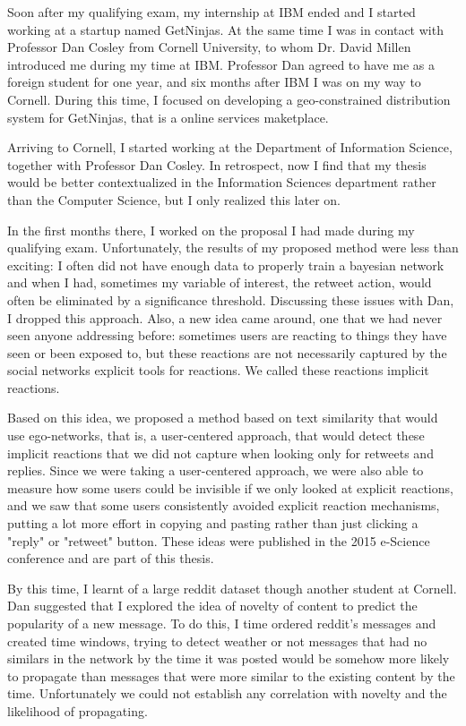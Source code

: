 Soon after my qualifying exam, my internship at IBM ended and I started working at a startup named GetNinjas. At the same time I was in contact with Professor Dan Cosley from Cornell University, to whom Dr. David Millen introduced me during my time at IBM. Professor Dan agreed to have me as a foreign student for one year, and six months after IBM I was on my way to Cornell. During this time, I focused on developing a geo-constrained distribution system for GetNinjas, that is a online services maketplace.

Arriving to Cornell, I started working at the Department of Information Science, together with Professor Dan Cosley. In retrospect, now I find that my thesis would be better contextualized in the Information Sciences department rather than the Computer Science, but I only realized this later on. 

In the first months there, I worked on the proposal I had made during my qualifying exam. Unfortunately, the results of my proposed method were less than exciting: I often did not have enough data to properly train a bayesian network and when I had, sometimes my variable of interest, the retweet action, would often be eliminated by a significance threshold. Discussing these issues with Dan, I dropped this approach. Also, a new idea came around, one that we had never seen anyone addressing before: sometimes users are reacting to things they have seen or been exposed to, but these reactions are not necessarily captured by the social networks explicit tools for reactions. We called these reactions implicit reactions.

Based on this idea, we proposed a method based on text similarity that would use ego-networks, that is, a user-centered approach, that would detect these implicit reactions that we did not capture when looking only for retweets and replies. Since we were taking a user-centered approach, we were also able to measure how some users could be invisible if we only looked at explicit reactions, and we saw that some users consistently avoided explicit reaction mechanisms, putting a lot more effort in copying and pasting rather than just clicking a "reply" or "retweet" button. These ideas were published in the 2015 e-Science conference and are part of this thesis.

By this time, I learnt of a large reddit dataset though another student at Cornell. Dan suggested that I explored the idea of novelty of content to predict the popularity of a new message. To do this, I time ordered reddit's messages and created time windows, trying to detect weather or not messages that had no similars in the network by the time it was posted would be somehow more likely to propagate than messages that were more similar to the existing content by the time. Unfortunately we could not establish any correlation with novelty and the likelihood of propagating.

